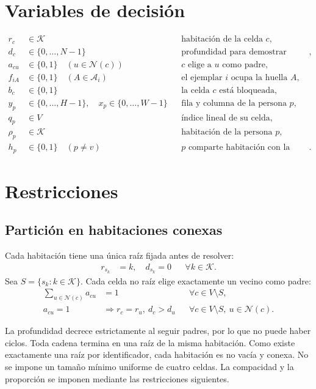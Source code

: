 \documentclass[11pt,a4paper]{article}
\newcommand{\B}{\{0,1\}}
\begin{document}
\section{Variables de decisi\'on}

\begin{align*}
 r_c&\in\mathcal K
     &&\text{habitaci\'on de la celda }c,\\
 d_c&\in\{0,\ldots,N-1\}
     &&\text{profundidad para demostrar conectividad},\\
 a_{cu}&\in\B \quad(u\in\mathcal N(c))
     &&\text{$c$ elige a $u$ como padre},\\
 f_{iA}&\in\B \quad(A\in\mathcal A_i)
     &&\text{el ejemplar $i$ ocupa la huella $A$},\\
 b_c&\in\B
     &&\text{la celda $c$ est\'a bloqueada},\\
 y_p&\in\{0,\ldots,H-1\},\quad
 x_p\in\{0,\ldots,W-1\}
     &&\text{fila y columna de la persona }p,\\
 q_p&\in V
     &&\text{\'indice lineal de su celda},\\
 \rho_p&\in\mathcal K
     &&\text{habitaci\'on de la persona }p,\\
 h_p&\in\B \quad(p\neq v)
     &&\text{$p$ comparte habitaci\'on con la v\'ictima}.
\end{align*}

\section{Restricciones}

\subsection{Partici\'on en habitaciones conexas}

Cada habitaci\'on tiene una \'unica ra\'iz fijada antes de resolver:
\begin{align}
 r_{s_k}&=k,\quad d_{s_k}=0 &&\forall k\in\mathcal K.
\end{align}
Sea $S=\{s_k:k\in\mathcal K\}$. Cada celda no ra\'iz elige
exactamente un vecino como padre:
\begin{align}
 \sum_{u\in\mathcal N(c)}a_{cu}&=1 &&\forall c\in V\setminus S,\\
 a_{cu}=1&\Longrightarrow r_c=r_u,\ d_c>d_u
     &&\forall c\in V\setminus S,\ u\in\mathcal N(c).
\end{align}

La profundidad decrece estrictamente al seguir padres, por lo que no
puede haber ciclos. Toda cadena termina en una ra\'iz de la misma
habitaci\'on. Como existe exactamente una ra\'iz por identificador,
cada habitaci\'on es no vac\'ia y conexa. No se impone un tama\~no
m\'inimo uniforme de cuatro celdas. La compacidad y la
proporci\'on se imponen mediante las restricciones siguientes.
\end{document}
